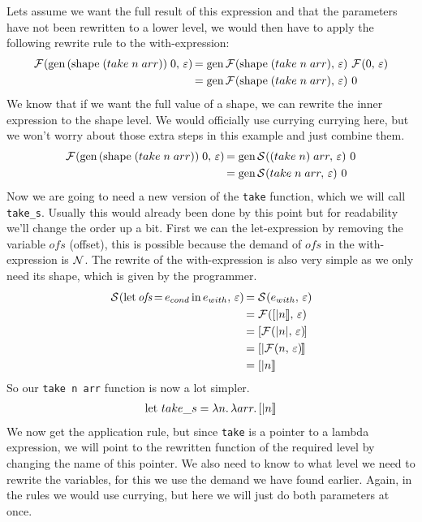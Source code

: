 \documentclass[../main.tex]{subfiles}
\begin{document}
Lets assume we want the full result of this expression and that the parameters have not been rewritten to a lower level, we would then have to apply the following rewrite rule to the with-expression:
\begin{align*}
\mathcal{F}\hspace{-1.2pt} \left( \text{gen}\, (\text{shape}\; (take\; n\; arr))\; 0,\, \varepsilon \right) \hspace{-1pt}
    &= \text{gen}\, \mathcal{F}\hspace{-1.2pt} \left( \text{shape}\; (take\; n\; arr),\, \varepsilon \right) \hspace{-1pt}\; \mathcal{F}\hspace{-1.2pt} \left( 0,\, \varepsilon \right) \hspace{-1pt} \\
    &= \text{gen}\, \mathcal{F}\hspace{-1.2pt} \left( \text{shape}\; (take\; n\; arr),\, \varepsilon \right) \hspace{-1pt}\; 0
\end{align*}
%
We know that if we want the full value of a shape, we can rewrite the inner expression to the shape level.
We would officially use currying currying here, but we won't worry about those extra steps in this example and just combine them.
\begin{align*}
\mathcal{F}\hspace{-1.2pt} \left( \text{gen}\, (\text{shape}\; (take\; n\; arr))\; 0,\, \varepsilon \right) \hspace{-1pt}
    &= \text{gen}\, \mathcal{S}\hspace{-1.2pt} \left( (take\; n)\; arr,\, \varepsilon \right) \hspace{-1pt}\; 0 \\
    &= \text{gen}\, \mathcal{S}\hspace{-1.2pt} \left( take\; n\; arr,\, \varepsilon \right) \hspace{-1pt}\; 0
\end{align*}
%
Now we are going to need a new version of the \texttt{take} function, which we will call \texttt{take\_s}. Usually this would already been done by this point but for readability we'll change the order up a bit. First we can the let-expression by removing the variable $\textit{ofs}$ (offset), this is possible because the demand of $\textit{ofs}$ in the with-expression is $\mathcal{N}$. The rewrite of the with-expression is also very simple as we only need its shape, which is given by the programmer.
\begin{align*}
\mathcal{S}\hspace{-1.2pt} \left( \text{let}\, \textit{ofs}\hspace{-1pt} =\hspace{-1pt} e_{cond}\, \text{in}\, e_{with},\, \varepsilon \right) \hspace{-1pt}
    &= \mathcal{S}\hspace{-1.2pt} \left( e_{with},\, \varepsilon \right) \hspace{-1pt} \\
    &= \mathcal{F}\hspace{-1.2pt} \left( [|n|],\, \varepsilon \right) \hspace{-1pt} \\
    &= [\mathcal{F}\hspace{-1.2pt} \left( |n|,\, \varepsilon \right) \hspace{-1pt}] \\
    &= [|\mathcal{F}\hspace{-1.2pt} \left( n,\, \varepsilon \right) \hspace{-1pt}|] \\
    &= [|n|]
\end{align*}
%
So our \texttt{take n arr} function is now a lot simpler.
\begin{align*}
    \text{let } take\_s = \lambda n.\, \lambda arr.\, [|n|]
\end{align*}
%
We now get the application rule, but since \texttt{take} is a pointer to a lambda expression, we will point to the rewritten function of the required level by changing the name of this pointer. We also need to know to what level we need to rewrite the variables, for this we use the demand we have found earlier. Again, in the rules we would use currying, but here we will just do both parameters at once.
\end{document}
